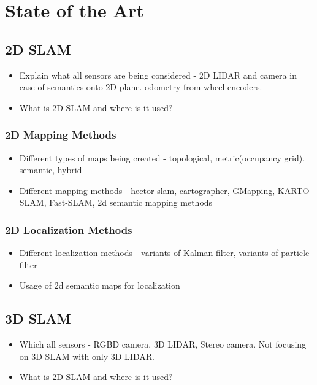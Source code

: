 \documentclass[report.tex]{subfiles}
\begin{document}
    \chapter{State of the Art}


    \section{2D SLAM}
    \begin{itemize}
        \item Explain what all sensors are being considered - 2D LIDAR and camera in case of semantics onto 2D plane. odometry from wheel encoders.
        \item What is 2D SLAM and where is it used?
    \end{itemize}

    \subsection{2D Mapping Methods}
    \begin{itemize}
        \item Different types of maps being created - topological, metric(occupancy grid), semantic, hybrid
        \item Different mapping methods - hector slam, cartographer, GMapping, KARTO-SLAM, Fast-SLAM, 2d semantic mapping methods
    \end{itemize}

    \subsection{2D Localization Methods}
    \begin{itemize}
        \item Different localization methods - variants of Kalman filter, variants of particle filter
        \item Usage of 2d semantic maps for localization
    \end{itemize}

    \section{3D SLAM}
    \begin{itemize}
        \item Which all sensors - RGBD camera, 3D LIDAR, Stereo camera. Not focusing on 3D SLAM with only 3D LIDAR.
        \item What is 2D SLAM and where is it used?
    \end{itemize}
\end{document}
